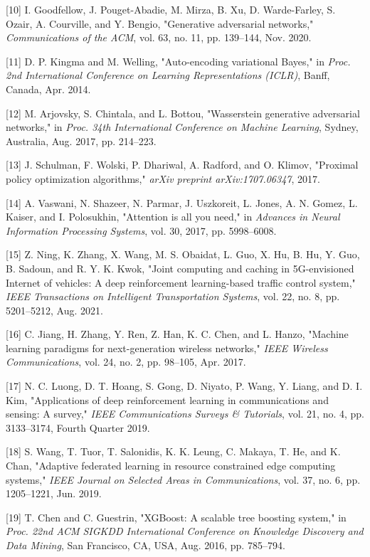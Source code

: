 \documentclass[conference]{IEEEtran}
\begin{document}
[10] I. Goodfellow, J. Pouget-Abadie, M. Mirza, B. Xu, D. Warde-Farley, S. Ozair, A. Courville, and Y. Bengio, "Generative adversarial networks," \textit{Communications of the ACM}, vol. 63, no. 11, pp. 139--144, Nov. 2020.

[11] D. P. Kingma and M. Welling, "Auto-encoding variational Bayes," in \textit{Proc. 2nd International Conference on Learning Representations (ICLR)}, Banff, Canada, Apr. 2014.

[12] M. Arjovsky, S. Chintala, and L. Bottou, "Wasserstein generative adversarial networks," in \textit{Proc. 34th International Conference on Machine Learning}, Sydney, Australia, Aug. 2017, pp. 214--223.

[13] J. Schulman, F. Wolski, P. Dhariwal, A. Radford, and O. Klimov, "Proximal policy optimization algorithms," \textit{arXiv preprint arXiv:1707.06347}, 2017.

[14] A. Vaswani, N. Shazeer, N. Parmar, J. Uszkoreit, L. Jones, A. N. Gomez, L. Kaiser, and I. Polosukhin, "Attention is all you need," in \textit{Advances in Neural Information Processing Systems}, vol. 30, 2017, pp. 5998--6008.

[15] Z. Ning, K. Zhang, X. Wang, M. S. Obaidat, L. Guo, X. Hu, B. Hu, Y. Guo, B. Sadoun, and R. Y. K. Kwok, "Joint computing and caching in 5G-envisioned Internet of vehicles: A deep reinforcement learning-based traffic control system," \textit{IEEE Transactions on Intelligent Transportation Systems}, vol. 22, no. 8, pp. 5201--5212, Aug. 2021.

[16] C. Jiang, H. Zhang, Y. Ren, Z. Han, K. C. Chen, and L. Hanzo, "Machine learning paradigms for next-generation wireless networks," \textit{IEEE Wireless Communications}, vol. 24, no. 2, pp. 98--105, Apr. 2017.

[17] N. C. Luong, D. T. Hoang, S. Gong, D. Niyato, P. Wang, Y. Liang, and D. I. Kim, "Applications of deep reinforcement learning in communications and sensing: A survey," \textit{IEEE Communications Surveys \& Tutorials}, vol. 21, no. 4, pp. 3133--3174, Fourth Quarter 2019.

[18] S. Wang, T. Tuor, T. Salonidis, K. K. Leung, C. Makaya, T. He, and K. Chan, "Adaptive federated learning in resource constrained edge computing systems," \textit{IEEE Journal on Selected Areas in Communications}, vol. 37, no. 6, pp. 1205--1221, Jun. 2019.

[19] T. Chen and C. Guestrin, "XGBoost: A scalable tree boosting system," in \textit{Proc. 22nd ACM SIGKDD International Conference on Knowledge Discovery and Data Mining}, San Francisco, CA, USA, Aug. 2016, pp. 785--794.
\end{document}
